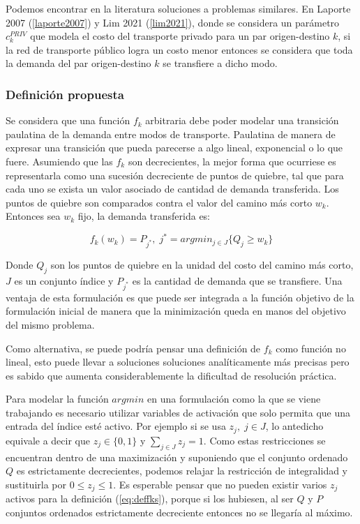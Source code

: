\documentclass{article}
\begin{document}
  Podemos encontrar en la literatura soluciones a problemas similares. En Laporte 2007 (\ref{laporte2007}) y Lim 2021 (\ref{lim2021}), donde se considera un parámetro $c^{PRIV}_k$ que modela el costo del transporte privado para un par origen-destino $k$, si la red de transporte público logra un costo menor entonces se considera que toda la demanda del par origen-destino $k$ se transfiere a dicho modo.

  \subsubsection*{Definición propuesta}

  Se considera que una función $f_k$ arbitraria debe poder modelar una transición paulatina de la demanda entre modos de transporte. Paulatina de manera de expresar una transición que pueda parecerse a algo lineal, exponencial o lo que fuere. Asumiendo que las $f_k$ son decrecientes, la mejor forma que ocurriese es representarla como una sucesión decreciente de puntos de quiebre, tal que para cada uno se exista un valor asociado de cantidad de demanda transferida. Los puntos de quiebre son comparados contra el valor del camino más corto $w_k$. Entonces sea $w_k$ fijo, la demanda transferida es:

  \begin{equation}
    \label{eq:deffks}
    f_k(w_k) = P_{j^*},\; j^* = argmin_{j \in J} \{Q_j \geq w_k\}
  \end{equation}
  
  Donde $Q_j$ son los puntos de quiebre en la unidad del costo del camino más corto, $J$ es un conjunto índice y $P_{j^*}$ es la cantidad de demanda que se transfiere. Una ventaja de esta formulación es que puede ser integrada a la función objetivo de la formulación inicial de manera que la minimización queda en manos del objetivo del mismo problema.

  Como alternativa, se puede podría pensar una definición de $f_k$ como función no lineal, esto puede llevar a soluciones soluciones analíticamente más precisas pero es sabido que aumenta considerablemente la dificultad de resolución práctica.

  Para modelar la función $argmin$ en una formulación como la que se viene trabajando es necesario utilizar variables de activación que solo permita que una entrada del índice esté activo. Por ejemplo si se usa $z_j,\; j \in J$, lo antedicho equivale a decir que $z_j \in \{0,1\}$ y $\sum_{j \in J} z_j = 1$. Como estas restricciones se encuentran dentro de una maximización y suponiendo que el conjunto ordenado $Q$ es estrictamente decrecientes, podemos relajar la restricción de integralidad y sustituirla por $0 \leq z_j \leq 1$. Es esperable pensar que no pueden existir varios $z_j$ activos para la definición (\ref{eq:deffks}), porque si los hubiesen, al ser $Q$ y $P$ conjuntos ordenados estrictamente decreciente entonces no se llegaría al máximo.
\end{document}
